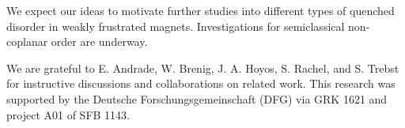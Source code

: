 \documentclass[twocolumn,english,aps,showpacs,prl,floatfix]{revtex4-1}
\begin{document}
We expect our ideas to motivate further studies into different types of quenched disorder in weakly frustrated magnets. Investigations for semiclassical non-coplanar order are underway.


\begin{acknowledgments}
We are grateful to E. Andrade, W. Brenig, J. A. Hoyos, S. Rachel, and S. Trebst for instructive discussions and collaborations on related work.
%
This research was supported by the Deutsche Forschungsgemeinschaft (DFG) via GRK 1621 and project A01 of SFB 1143.
\end{acknowledgments}

\end{document}
